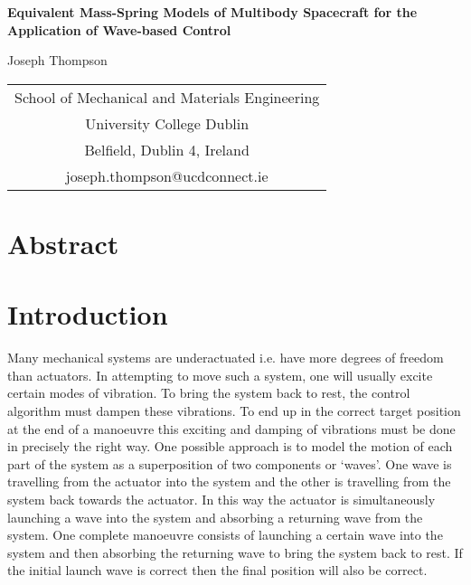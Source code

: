 \documentclass{mbd_fullpaper}
\begin{document}
\newcommand{\heading}[1]{
   {\medskip\hskip5em\bf\large{#1}
   \vskip0.5ex
   }
}
\newcommand{\eqnref}[1]{
  (\ref{#1})
}

\renewcommand{\refname}{\medskip\bf\large References}



\begin{center}
  \Large{\bf
Equivalent Mass-Spring Models of Multibody Spacecraft for the Application of Wave-based Control  }
\end{center}

\begin{center}
\large{
Joseph Thompson
}
\end{center}

{
\begin{center}
 \small
  \begin{tabular}{c}
    School of Mechanical and Materials Engineering \\
    University College Dublin              \\
    Belfield, Dublin 4, Ireland        \\
    joseph.thompson@ucdconnect.ie                        \\
  \end{tabular}
\end{center}
}




\section*{Abstract}

\section{Introduction}

Many mechanical systems are underactuated i.e. have more degrees of freedom than actuators.
In attempting to move such a system, one will usually excite certain modes of vibration.
To bring the system back to rest, the control algorithm must dampen these vibrations.
To end up in the correct target position at the end of a manoeuvre this exciting and damping of vibrations must be done in precisely the right way.
One possible approach is to model the motion of each part of the system as a superposition of two components or `waves'.
One wave is travelling from the actuator into the system and the other is travelling from the system back towards the actuator.
In this way the actuator is simultaneously launching a wave into the system and absorbing a returning wave from the system.
One complete manoeuvre consists of launching a certain wave into the system and then absorbing the returning wave to bring the system back to rest.
If the initial launch wave is correct then the final position will also be correct.
\end{document}
